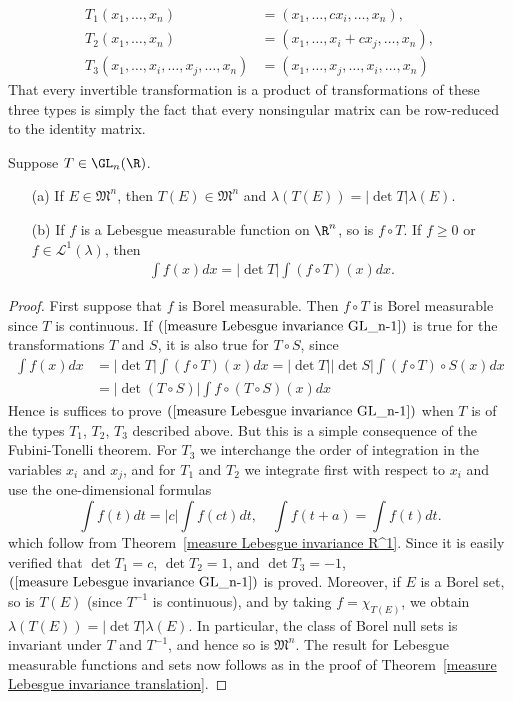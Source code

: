 \begin{align*}
T_1(x_1,\dots,x_n)&=(x_1,\dots,cx_i,\dots,x_n),\\
T_2(x_1,\dots,x_n)&=(x_1,\dots,x_i+cx_j,\dots,x_n),\\
T_3(x_1,\dots,x_i,\dots,x_j,\dots,x_n)&=(x_1,\dots,x_j,\dots,x_i,\dots,x_n)
\end{align*}
That every invertible transformation is a product of transformations of these three types is simply the fact that every nonsingular matrix can be row-reduced to the identity matrix.
\begin{theorem}\label{measure Lebesgue invariance GL_n}
Suppose $T\in\GL_n(\R)$.
\begin{itemize}
\item[(a)] If $E\in\mathfrak{M}^n$, then $T(E)\in\mathfrak{M}^n$ and $\lambda(T(E))=|\det T|\lambda(E)$.
\item[(b)] If $f$ is a Lebesgue measurable function on $\R^n$, so is $f\circ T$. If $f\geq 0$ or $f\in\mathcal{L}^1(\lambda)$, then
\begin{align}\label{measure Lebesgue invariance GL_n-1}
\int f(x)dx=|\det T|\int (f\circ T)(x)dx.
\end{align} 
\end{itemize}
\end{theorem}
\begin{proof}
First suppose that $f$ is Borel measurable. Then $f\circ T$ is Borel measurable since $T$ is continuous. If $(\ref{measure Lebesgue invariance GL_n-1})$ is true for the transformations $T$ and $S$, it is also true for $T\circ S$, since
\begin{align*}
\int f(x)dx&=|\det T|\int(f\circ T)(x)dx=|\det T||\det S|\int(f\circ T)\circ S(x)dx\\
&=|\det(T\circ S)|\int f\circ (T\circ S)(x)dx
\end{align*}
Hence is suffices to prove $(\ref{measure Lebesgue invariance GL_n-1})$ when $T$ is of the types $T_1$, $T_2$, $T_3$ described above. But this is a simple consequence of the Fubini-Tonelli theorem. For $T_3$ we interchange the order of integration in the variables $x_i$ and $x_j$, and for $T_1$ and $T_2$ we integrate first with respect to $x_i$ and use the one-dimensional formulas
\[\int f(t)dt=|c|\int f(ct)dt,\quad\int f(t+a)=\int f(t)dt.\]
which follow from Theorem~\ref{measure Lebesgue invariance R^1}. Since it is easily verified that $\det T_1=c$, $\det T_2=1$, and $\det T_3=-1$, $(\ref{measure Lebesgue invariance GL_n-1})$ is proved. Moreover, if $E$ is a Borel set, so is $T(E)$ (since $T^{-1}$ is continuous), and by taking $f=\chi_{T(E)}$, we obtain $\lambda(T(E))=|\det T|\lambda(E)$. In particular, the class of Borel null sets is invariant under $T$ and $T^{-1}$, and hence so is $\mathfrak{M}^n$. The result for Lebesgue measurable functions and sets now follows as in the proof of Theorem~\ref{measure Lebesgue invariance translation}.
\end{proof}
